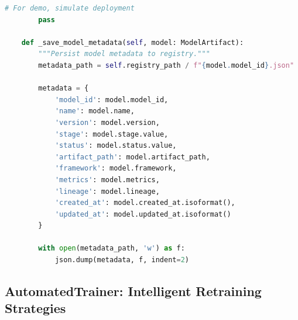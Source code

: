 \begin{lstlisting}[language=Python, caption={Enterprise MLOps Platform with Full Lifecycle Management}]
        # For demo, simulate deployment
        pass

    def _save_model_metadata(self, model: ModelArtifact):
        """Persist model metadata to registry."""
        metadata_path = self.registry_path / f"{model.model_id}.json"

        metadata = {
            'model_id': model.model_id,
            'name': model.name,
            'version': model.version,
            'stage': model.stage.value,
            'status': model.status.value,
            'artifact_path': model.artifact_path,
            'framework': model.framework,
            'metrics': model.metrics,
            'lineage': model.lineage,
            'created_at': model.created_at.isoformat(),
            'updated_at': model.updated_at.isoformat()
        }

        with open(metadata_path, 'w') as f:
            json.dump(metadata, f, indent=2)
\end{lstlisting}

\subsection{AutomatedTrainer: Intelligent Retraining Strategies}

